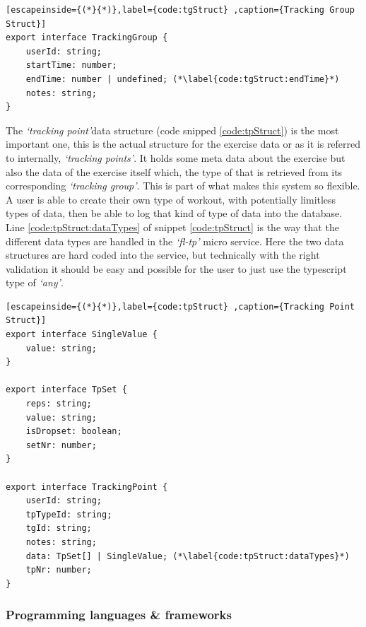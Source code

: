 \documentclass{article}
\newcommand{\vspaceconst}{-2ex}
\newcommand{\tp}{\textit{`tracking point'}}
\newcommand{\tps}{\textit{`tracking points'}}
\newcommand{\tg}{\textit{`tracking group'}}
\begin{document}
\begin{multicols}{2}
\begin{lstlisting}[escapeinside={(*}{*)},label={code:tgStruct} ,caption={Tracking Group Struct}]
export interface TrackingGroup {
    userId: string;
    startTime: number;
    endTime: number | undefined; (*\label{code:tgStruct:endTime}*)
    notes: string;
}
\end{lstlisting}

The \tp data structure (code snipped \ref{code:tpStruct}) is the most important one, this is the actual structure for the exercise data or as it is referred to internally, \tps. It holds some meta data about the exercise but also the data of the exercise itself which, the type of that is retrieved from its corresponding \tg. This is part of what makes this system so flexible. A user is able to create their own type of workout, with potentially limitless types of data, then be able to log that kind of type of data into the database. Line \ref{code:tpStruct:dataTypes} of snippet \ref{code:tpStruct} is the way that the different data types are handled in the \textit{`fl-tp'} micro service. Here the two data structures are hard coded into the service, but technically with the right validation it should be easy and possible for the user to just use the typescript type of \textit{`any'}.\\

\begin{lstlisting}[escapeinside={(*}{*)},label={code:tpStruct} ,caption={Tracking Point Struct}]
export interface SingleValue {
    value: string;
}

export interface TpSet {
    reps: string;
    value: string;
    isDropset: boolean;
    setNr: number;
}

export interface TrackingPoint {
    userId: string;
    tpTypeId: string;
    tgId: string;
    notes: string;
    data: TpSet[] | SingleValue; (*\label{code:tpStruct:dataTypes}*)
    tpNr: number;
}
\end{lstlisting}

\subsubsection{Programming languages \& frameworks}
\vspace{\vspaceconst}


\end{multicols}
\end{document}
